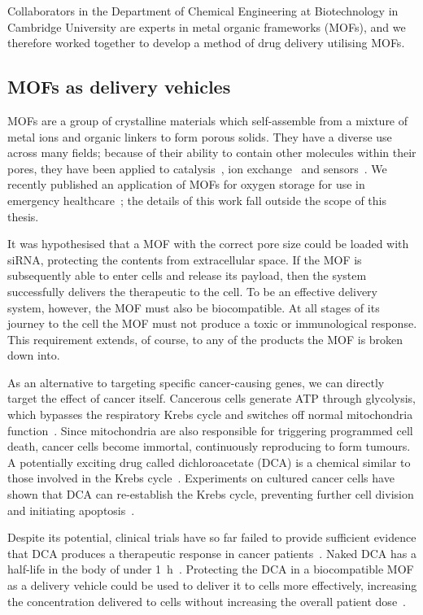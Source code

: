 Collaborators in the Department of Chemical Engineering at Biotechnology in Cambridge University are experts in metal organic frameworks (MOFs), and we therefore worked together to develop a method of drug delivery utilising MOFs.


\subsection{MOFs as delivery vehicles}
MOFs are a group of crystalline materials which self-assemble from a mixture of metal ions and organic linkers to form porous solids.
They have a diverse use across many fields; because of their ability to contain other molecules within their pores, they have been applied to catalysis~\cite{ma2009enantioselective, farrusseng2011metal}, ion exchange~\cite{custelcean2007anion, fei2010reversible} and sensors~\cite{kreno2011metal, miller2016metal}.
We recently published an application of MOFs for oxygen storage for use in emergency healthcare~\cite{moghadam2018computer}; the details of this work fall outside the scope of this thesis.

It was hypothesised that a MOF with the correct pore size could be loaded with siRNA, protecting the contents from extracellular space.
If the MOF is subsequently able to enter cells and release its payload, then the system successfully delivers the therapeutic to the cell.
To be an effective delivery system, however, the MOF must also be biocompatible.
At all stages of its journey to the cell the MOF must not produce a toxic or immunological response.
This requirement extends, of course, to any of the products the MOF is broken down into.

As an alternative to targeting specific cancer-causing genes, we can directly target the effect of cancer itself.
Cancerous cells generate ATP through glycolysis, which bypasses the respiratory Krebs cycle and switches off normal mitochondria function~\cite{murray1993cell, warburg1930uber}.
Since mitochondria are also responsible for triggering programmed cell death, cancer cells become immortal, continuously reproducing to form tumours.
A potentially exciting drug called dichloroacetate (DCA) is a chemical similar to those involved in the Krebs cycle~\cite{michelakis2008dichloroacetate, matsuhashi2015activation}.
Experiments on cultured cancer cells have shown that DCA can re-establish the Krebs cycle, preventing further cell division and initiating apoptosis~\cite{bonnet2007mitochondria}.

Despite its potential, clinical trials have so far failed to provide sufficient evidence that DCA produces a therapeutic response in cancer patients~\cite{michelakis2010metabolic}.
Naked DCA has a half-life in the body of under \SI{1}{\hour}~\cite{michelakis2008dichloroacetate}.
Protecting the DCA in a biocompatible MOF as a delivery vehicle could be used to deliver it to cells more effectively, increasing the concentration delivered to cells without increasing the overall patient dose~\cite{abanades2018mechanistic}.

